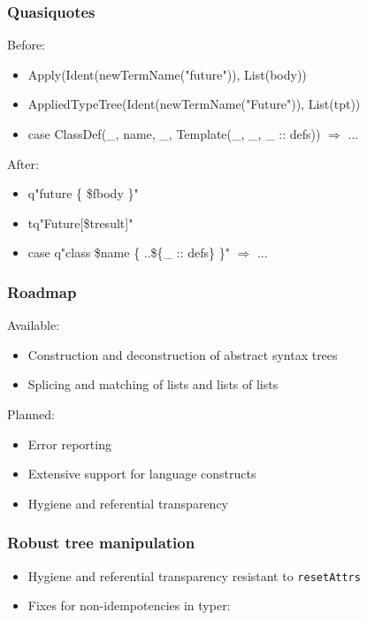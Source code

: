 \documentclass[svgnames,hyperref={bookmarks=false}]{beamer}
\begin{document}
\begin{frame}[fragile]
\frametitle{Quasiquotes}

Before:
\begin{itemize}
\item Apply(Ident(newTermName("future")), List(body))
\item AppliedTypeTree(Ident(newTermName("Future")), List(tpt))
\item case ClassDef(\_, name, \_, Template(\_, \_, \_ :: defs)) $\Rightarrow$ ...
\end{itemize}
\vskip25pt
After:
\begin{itemize}
\item q"future \{ \$fbody \}"
\item tq"Future[\$tresult]"
\item case q"class \$name \{ ..\$\{\_ :: defs\} \}" $\Rightarrow$ ...
\end{itemize}
\end{frame}

\begin{frame}[fragile]
\frametitle{Roadmap}

Available:
\begin{itemize}
\item Construction and deconstruction of abstract syntax trees
\item Splicing and matching of lists and lists of lists
\end{itemize}
\vskip25pt
Planned:
\begin{itemize}
\item Error reporting
\item Extensive support for language constructs
\item Hygiene and referential transparency
\end{itemize}
\end{frame}

\begin{frame}[fragile]
\frametitle{}

\vskip40pt
\begin{center}
\end{center}
\end{frame}

\begin{frame}[fragile]
\frametitle{Robust tree manipulation}

\begin{itemize}
\item Hygiene and referential transparency resistant to \texttt{resetAttrs}
\item Fixes for non-idempotencies in typer: 
\end{itemize}
\end{frame}
\end{document}
